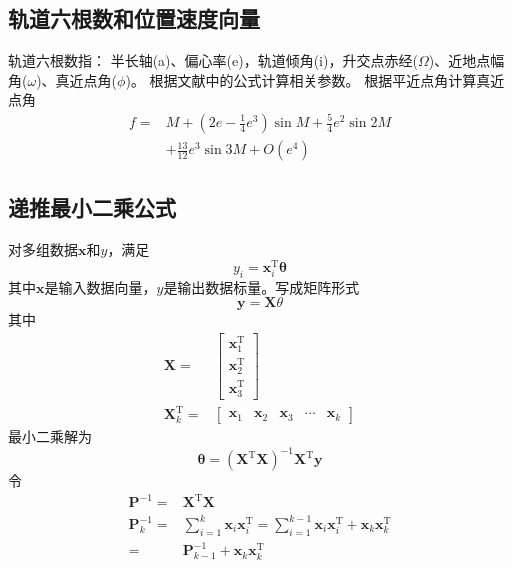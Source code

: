 \subsection{轨道六根数和位置速度向量}
轨道六根数指：
半长轴(a)、偏心率(e)，轨道倾角(i)，升交点赤经($\Omega$)、近地点幅角($\omega$)、真近点角($\phi$)。
根据文献\cite{mruiter2012}中的公式计算相关参数。
根据平近点角计算真近点角\cite{msmart1977}
\begin{align*}
    f =& M+\left(2e-{\frac {1}{4}}e^{3}\right)\sin {M}
    + {\frac {5}{4}}e^{2}\sin {2M} \\
    &+ {\frac {13}{12}}e^{3}\sin {3M}+O(e^{4})
\end{align*}

\subsection{递推最小二乘公式}
对多组数据$\boldsymbol{x}$和$y$，满足
\[y_i = \boldsymbol{x}^\mathrm{T}_i\boldsymbol{\theta}\]
其中$\boldsymbol{x}$是输入数据向量，$y$是输出数据标量。写成矩阵形式
\[\boldsymbol{y} = \mathbf{X}\theta\]
其中
\begin{align*}
    \mathbf{X} =& \left[\begin{matrix}
        \boldsymbol{x}^\mathrm{T}_1 \\
        \boldsymbol{x}^\mathrm{T}_2 \\
        \boldsymbol{x}^\mathrm{T}_3
    \end{matrix}\right] \\
    \mathbf{X}^\mathrm{T}_k =& \left[\begin{matrix}
        \boldsymbol{x}_1 & \boldsymbol{x}_2 & \boldsymbol{x}_3 &
        \cdots & \boldsymbol{x}_k
    \end{matrix}\right]
\end{align*}
最小二乘解为
\begin{equation*}
    \boldsymbol{\theta}
    =(\mathbf{X}^\mathrm{T}\mathbf{X})^{-1}
    \mathbf{X}^\mathrm{T}\boldsymbol{y}\tag{2.1}
\end{equation*}
令
\begin{align*}
    \mathbf{P}^{-1} =& \mathbf{X}^\mathrm{T}\mathbf{X} \\
    \mathbf{P}_k^{-1} =& \sum_{i=1}^k\boldsymbol{x}_i\boldsymbol{x}^\mathrm{T}_i
    = \sum_{i=1}^{k-1}\boldsymbol{x}_i\boldsymbol{x}^\mathrm{T}_i
    +\boldsymbol{x}_k\boldsymbol{x}^\mathrm{T}_k \\
    =& \mathbf{P}_{k-1}^{-1} + \boldsymbol{x}_k\boldsymbol{x}_k^\mathrm{T}
\end{align*}

